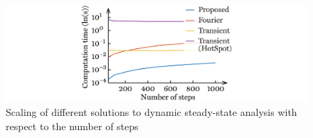 \begin{figure}
  \centering
  \includegraphics[width=1.0\linewidth]{include/assets/figures/utopia-dynamic-steady-state-speed-steps.pdf}
  \caption{
    Scaling of different solutions to dynamic steady-state analysis with respect
    to the number of steps
  }
\end{figure}
